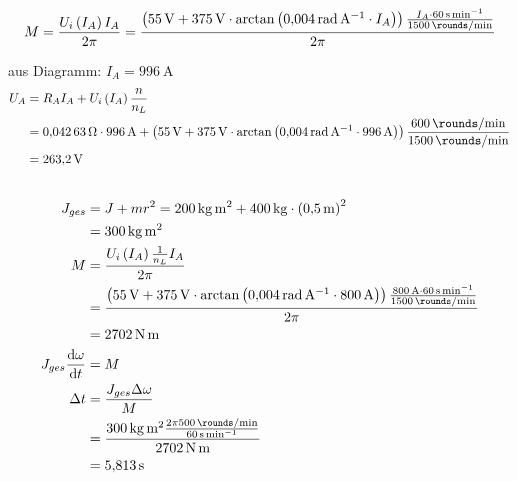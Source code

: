 \documentclass[11pt,a4paper]{scrartcl}
\newcommand{\mybr}[1]{\left(#1\right)}
\newcommand{\0}{_{\mybr{0}}}
\newcommand{\1}{_{\mybr{1}}}
\newcommand{\2}{_{\mybr{2}}}
\renewcommand{\d}{\mathrm{d}}
\begin{document}
\subsection{}
\begin{equation}
M=\frac{U_i\mybr{I_A} I_A}{2\pi}=\frac{\mybr{\SI{55}{\volt}+\SI{375}{\volt}\cdot\arctan\mybr{\SI{0.004}{\radian\per\ampere}\cdot I_A}}\frac{I_A \cdot\SI{60}{\second\per\minute}}{\SI{1500}{\rounds\per\minute}}}{2\pi}
\end{equation}
\begin{figure*}[!htbp]
	\centering
\end{figure*}

aus Diagramm: $I_A=\SI{996}{\ampere}$
\begin{align}
U_A&=R_A I_A + U_i\mybr{I_A}\frac{n}{n_L}\\
&=\SI{0.04263}{\ohm}\cdot\SI{996}{\ampere}+\mybr{\SI{55}{\volt}+\SI{375}{\volt}\cdot\arctan\mybr{\SI{0.004}{\radian\per\ampere}\cdot\SI{996}{\ampere}}}\frac{\SI{600}{\rounds\per\minute}}{\SI{1500}{\rounds\per\minute}}\\
&=\SI{263.2}{\volt}
\end{align}

\subsection{}
\begin{align}
J_{ges}&=J+m r^2=\SI{200}{\kilogram\meter\squared}+\SI{400}{\kilogram}\cdot\mybr{\SI{0.5}{\meter}}^2\\
&=\SI{300}{\kilogram\meter\squared}\\
M&=\frac{U_i\mybr{I_A}\frac{1}{n_L}I_A}{2\pi}\\
&=\frac{\mybr{\SI{55}{\volt}+\SI{375}{\volt}\cdot\arctan\mybr{\SI{0.004}{\radian\per\ampere}\cdot\SI{800}{\ampere}}}\frac{\SI{800}{\ampere}\cdot\SI{60}{\second\per\minute}}{\SI{1500}{\rounds\per\minute}}}{2\pi}\\
&=\SI{2702}{\newton\meter}\\
J_{ges}\frac{\d\omega}{\d t}&=M\\
\Delta t&=\frac{J_{ges}\Delta\omega}{M}\\
&=\frac{\SI{300}{\kilogram\meter\squared}\frac{2\pi\SI{500}{\rounds\per\minute}}{\SI{60}{\second\per\minute}}}{\SI{2702}{\newton\meter}}\\
&=\SI{5.813}{\second}
\end{align}
\end{document}
